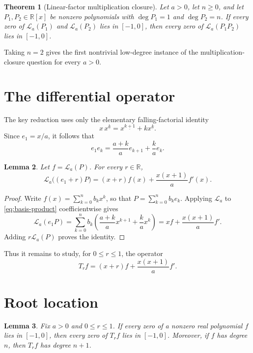\documentclass[11pt]{article}
\newtheorem{theorem}{Theorem}
\newtheorem{lemma}[theorem]{Lemma}
\newcommand{\RR}{\mathbb{R}}
\newcommand{\La}{\mathcal{L}_a}
\begin{document}
\begin{theorem}[Linear-factor multiplication closure]\label{thm:main}
Let $a>0$, let $n\geq0$, and let $P_1,P_2\in\RR[x]$ be nonzero polynomials
with $\operatorname{deg} P_1=1$ and $\operatorname{deg} P_2=n$.  If every zero of $\La(P_1)$ and
$\La(P_2)$ lies in $[-1,0]$, then every zero of $\La(P_1P_2)$ lies in
$[-1,0]$.
\end{theorem}

Taking $n=2$ gives the first nontrivial low-degree instance of the
multiplication-closure question for every $a>0$.

\section{The differential operator}

The key reduction uses only the elementary falling-factorial identity
\[
 x\,x^{\underline{k}}=x^{\underline{k+1}}+k x^{\underline{k}}.
\]
Since $e_1=x/a$, it follows that
\begin{equation}\label{eq:basis-product}
 e_1e_k=\frac{a+k}{a}e_{k+1}+\frac{k}{a}e_k.
\end{equation}

\begin{lemma}\label{lem:operator}
Let $f=\La(P)$.  For every $r\in\RR$,
\begin{equation}\label{eq:operator}
 \La\bigl((e_1+r)P\bigr)
   =(x+r)f(x)+\frac{x(x+1)}{a}f'(x).
\end{equation}
\end{lemma}

\begin{proof}
Write $f(x)=\sum_{k=0}^n b_kx^k$, so that
$P=\sum_{k=0}^n b_ke_k$.  Applying $\La$ to
\eqref{eq:basis-product} coefficientwise gives
\[
 \La(e_1P)=\sum_{k=0}^n b_k
 \left(\frac{a+k}{a}x^{k+1}+\frac{k}{a}x^k\right)
 =xf+\frac{x(x+1)}a f'.
\]
Adding $r\La(P)$ proves the identity.
\end{proof}

Thus it remains to study, for $0\leq r\leq1$, the operator
\begin{equation}\label{eq:Tr}
 T_rf=(x+r)f+\frac{x(x+1)}a f'.
\end{equation}

\section{Root location}

\begin{lemma}\label{lem:location}
Fix $a>0$ and $0\leq r\leq1$.  If every zero of a nonzero real polynomial
$f$ lies in $[-1,0]$, then every zero of $T_rf$ lies in $[-1,0]$.
Moreover, if $f$ has degree $n$, then $T_rf$ has degree $n+1$.
\end{lemma}
\end{document}
